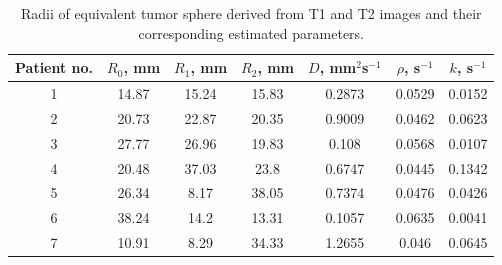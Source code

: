 \documentclass{aims}
\numberwithin{equation}{section}
\begin{document}
%

\begin{table}[H]
\begin{center}
\caption{\label{tab:Patient-data-para} Radii of equivalent tumor sphere derived
from T1 and T2 images and their corresponding estimated parameters.}
\begin{tabular}{ccccccc} \hline
Patient no. & $R_0$, mm & $R_1$, mm & $R_2$, mm & $D$, mm$^{2} $s$^{-1}$ & $\rho$, s$^{-1}$ & $k$, s$^{-1}$\\ \hline

1 & 14.87 & 15.24 & 15.83 & 0.2873 & 0.0529 & 0.0152 \\
2 & 20.73 & 22.87 & 20.35 & 0.9009 & 0.0462 & 0.0623 \\
3 & 27.77 & 26.96 & 19.83 & 0.108  & 0.0568 & 0.0107 \\
4 & 20.48 & 37.03 & 23.8  & 0.6747 & 0.0445 & 0.1342 \\
5 & 26.34 & 8.17  & 38.05 & 0.7374 & 0.0476 & 0.0426 \\
6 & 38.24 & 14.2  & 13.31 & 0.1057 & 0.0635 & 0.0041 \\
7 & 10.91 & 8.29  & 34.33 & 1.2655 & 0.046  & 0.0645 \\ \hline
\end{tabular}
\end{center}
\end{table}
\end{document}
